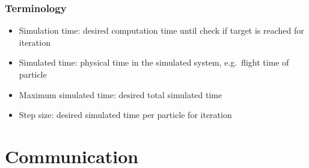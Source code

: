 %
%

\subsubsection{Terminology}
\begin{itemize}[noitemsep,topsep=0pt, partopsep=0pt]
\item Simulation time: desired computation time until check if target is reached for iteration
\item Simulated time: physical time in the simulated system, e.g.\ flight time of particle
\item Maximum simulated time: desired total simulated time
\item Step size: desired simulated time per particle for iteration
\end{itemize}

\section{Communication}
